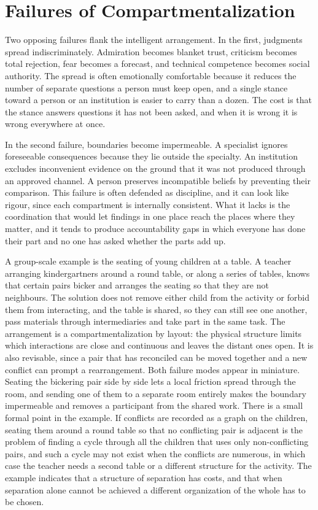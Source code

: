\documentclass[12pt, a4paper]{article}
\begin{document}
\section{Failures of Compartmentalization}

Two opposing failures flank the intelligent arrangement. In the first, judgments spread indiscriminately. Admiration becomes blanket trust, criticism becomes total rejection, fear becomes a forecast, and technical competence becomes social authority. The spread is often emotionally comfortable because it reduces the number of separate questions a person must keep open, and a single stance toward a person or an institution is easier to carry than a dozen. The cost is that the stance answers questions it has not been asked, and when it is wrong it is wrong everywhere at once.

In the second failure, boundaries become impermeable. A specialist ignores foreseeable consequences because they lie outside the specialty. An institution excludes inconvenient evidence on the ground that it was not produced through an approved channel. A person preserves incompatible beliefs by preventing their comparison. This failure is often defended as discipline, and it can look like rigour, since each compartment is internally consistent. What it lacks is the coordination that would let findings in one place reach the places where they matter, and it tends to produce accountability gaps in which everyone has done their part and no one has asked whether the parts add up.

A group-scale example is the seating of young children at a table. A teacher arranging kindergartners around a round table, or along a series of tables, knows that certain pairs bicker and arranges the seating so that they are not neighbours. The solution does not remove either child from the activity or forbid them from interacting, and the table is shared, so they can still see one another, pass materials through intermediaries and take part in the same task. The arrangement is a compartmentalization by layout: the physical structure limits which interactions are close and continuous and leaves the distant ones open. It is also revisable, since a pair that has reconciled can be moved together and a new conflict can prompt a rearrangement. Both failure modes appear in miniature. Seating the bickering pair side by side lets a local friction spread through the room, and sending one of them to a separate room entirely makes the boundary impermeable and removes a participant from the shared work. There is a small formal point in the example. If conflicts are recorded as a graph on the children, seating them around a round table so that no conflicting pair is adjacent is the problem of finding a cycle through all the children that uses only non-conflicting pairs, and such a cycle may not exist when the conflicts are numerous, in which case the teacher needs a second table or a different structure for the activity. The example indicates that a structure of separation has costs, and that when separation alone cannot be achieved a different organization of the whole has to be chosen.
\end{document}
